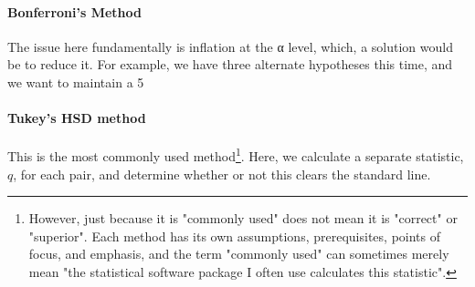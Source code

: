 \documentclass{ltjbook}
\begin{document}
\paragraph{Bonferroni's Method} The issue here fundamentally is inflation at the α level, which, a solution would be to reduce it. For example, we have three alternate hypotheses this time, and we want to maintain a 5%

\paragraph{Tukey's HSD method} This is the most commonly used method\footnote{However, just because it is "commonly used" does not mean it is "correct" or "superior". Each method has its own assumptions, prerequisites, points of focus, and emphasis, and the term "commonly used" can sometimes merely mean "the statistical software package I often use calculates this statistic".}. Here, we calculate a separate statistic, $q$, for each pair, and determine whether or not this clears the standard line.
\end{document}
